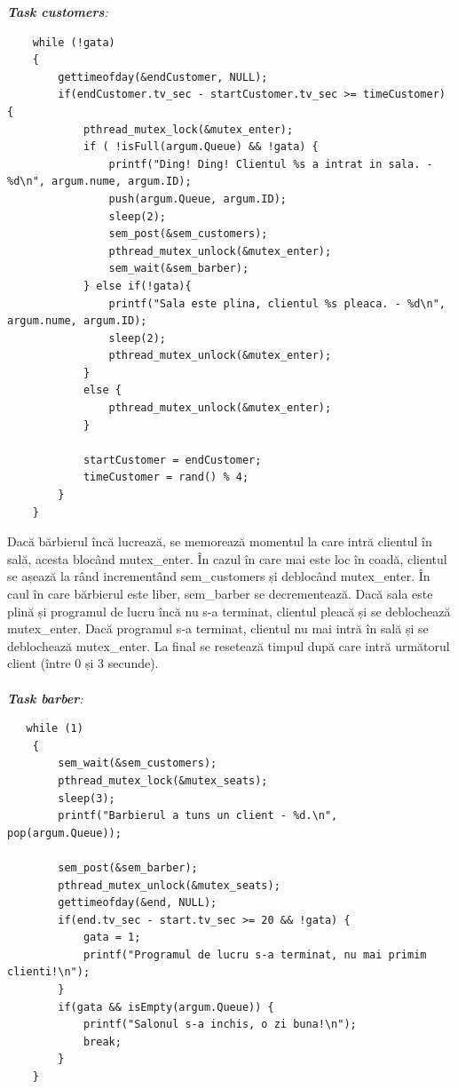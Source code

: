 \documentclass[a4paper, 11pt]{article}
\begin{document}
\noindent
{\it \textbf{Task customers}:}
{\small
\begin{verbatim}
    while (!gata)
    {
        gettimeofday(&endCustomer, NULL);
        if(endCustomer.tv_sec - startCustomer.tv_sec >= timeCustomer) {
            pthread_mutex_lock(&mutex_enter);
            if ( !isFull(argum.Queue) && !gata) {
                printf("Ding! Ding! Clientul %s a intrat in sala. - %d\n", argum.nume, argum.ID);
                push(argum.Queue, argum.ID);
                sleep(2);
                sem_post(&sem_customers);
                pthread_mutex_unlock(&mutex_enter);
                sem_wait(&sem_barber);
            } else if(!gata){
                printf("Sala este plina, clientul %s pleaca. - %d\n", argum.nume, argum.ID);
                sleep(2);
                pthread_mutex_unlock(&mutex_enter);
            }
            else {
                pthread_mutex_unlock(&mutex_enter);
            }
            
            startCustomer = endCustomer;
            timeCustomer = rand() % 4;
        }  
    }
\end{verbatim}

Dacă bărbierul încă lucrează, se memorează momentul la care intră clientul în sală, acesta blocând mutex\_enter. În cazul în care mai este loc în coadă, clientul se așează la rând incrementând sem\_customers și deblocând mutex\_enter. În caul în care bărbierul este liber, sem\_barber se decrementează. Dacă sala este plină și programul de lucru încă nu s-a terminat, clientul pleacă și se deblochează mutex\_enter. Dacă programul s-a terminat, clientul nu mai intră în sală și se deblochează mutex\_enter. La final se resetează timpul după care intră următorul client (între 0 și 3 secunde).
\paragraph{}

{\large\it \textbf{Task barber}:}
{\small
\begin{verbatim}
   while (1)
    {
        sem_wait(&sem_customers);
        pthread_mutex_lock(&mutex_seats);
        sleep(3);
        printf("Barbierul a tuns un client - %d.\n", pop(argum.Queue));
       
        sem_post(&sem_barber);  
        pthread_mutex_unlock(&mutex_seats);
        gettimeofday(&end, NULL);
        if(end.tv_sec - start.tv_sec >= 20 && !gata) {
            gata = 1;
            printf("Programul de lucru s-a terminat, nu mai primim clienti!\n");
        }
        if(gata && isEmpty(argum.Queue)) {
            printf("Salonul s-a inchis, o zi buna!\n");
            break;
        }
    }
\end{verbatim}

}}
\end{document}
